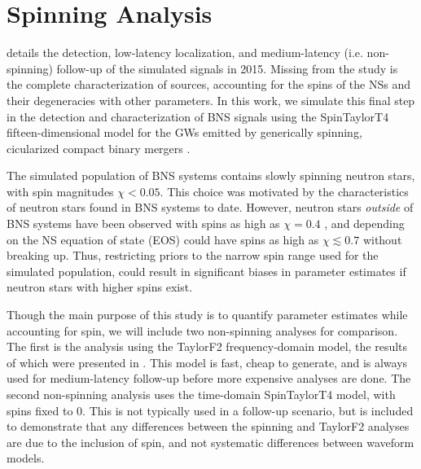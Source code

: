 \section{Spinning Analysis}
\label{sec:spin}

\citet{Singer_2014} details the detection, low-latency localization, and medium-latency (i.e. non-spinning) follow-up of the simulated signals in 2015.  Missing from the study is the complete characterization of sources, accounting for the spins of the NSs and their degeneracies with other parameters.  In this work, we simulate this final step in the detection and characterization of BNS signals using the SpinTaylorT4 fifteen-dimensional model for the GWs emitted by generically spinning, cicularized compact binary mergers \citep{Buonanno_2003,Buonanno_2009}.

The simulated population of BNS systems contains slowly spinning neutron stars, with spin magnitudes $\chi < 0.05$.  This choice was motivated by the characteristics of neutron stars found in BNS systems to date. However, neutron stars \emph{outside} of BNS systems have been observed with spins as high as $\chi = 0.4$ \citep{Hessels_2006,Brown_2012}, and depending on the NS equation of state (EOS) could have spins as high as $\chi \lesssim 0.7$ \citep{Lo_2011} without breaking up.  Thus, restricting priors to the narrow spin range used for the simulated population, could result in significant biases in parameter estimates if neutron stars with higher spins exist.

Though the main purpose of this study is to quantify parameter estimates while accounting for spin, we will include two non-spinning analyses for comparison.  The first is the analysis using the TaylorF2 frequency-domain model, the results of which were presented in \citet{Singer_2014}.  This model is fast, cheap to generate, and is always used for medium-latency follow-up before more expensive analyses are done.  The second non-spinning analysis uses the time-domain SpinTaylorT4 model, with spins fixed to $0$.  This is not typically used in a follow-up scenario, but is included to demonstrate that any differences between the spinning and TaylorF2 analyses are due to the inclusion of spin, and not systematic differences between waveform models.

